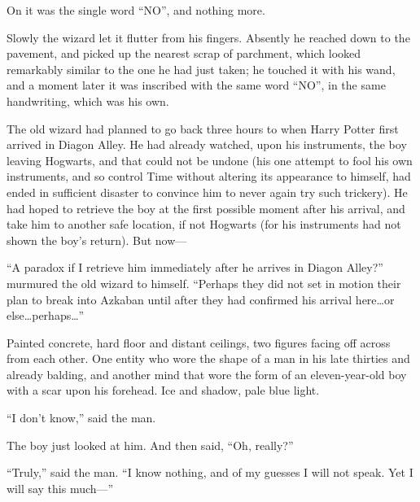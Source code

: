 On it was the single word
“NO”, and nothing more.

Slowly the wizard let it flutter from his fingers. Absently he reached down to the pavement, and picked up the nearest scrap of parchment, which looked remarkably similar to the one he had just taken; he touched it with his wand, and a moment later it was inscribed with the same word
“NO”, in the same handwriting, which was his own.

The old wizard had planned to go back three hours to when Harry Potter first arrived in Diagon Alley. He had already watched, upon his instruments, the boy leaving Hogwarts, and that could not be undone (his one attempt to fool his own instruments, and so control Time without altering its appearance to himself, had ended in sufficient disaster to convince him to never again try such trickery). He had hoped to retrieve the boy at the first possible moment after his arrival, and take him to another safe location, if not Hogwarts (for his instruments had not shown the boy’s return). But now—

“A paradox if I retrieve him immediately after he arrives in Diagon Alley?” murmured the old wizard to himself.
“Perhaps they did not set in motion their plan to break into Azkaban until after they had confirmed his arrival here…or else…perhaps…”

\later

Painted concrete, hard floor and distant ceilings, two figures facing off across from each other. One entity who wore the shape of a man in his late thirties and already balding, and another mind that wore the form of an eleven-year-old boy with a scar upon his forehead. Ice and shadow, pale blue light.

“I don’t know,” said the man.

The boy just looked at him. And then said,
“Oh, really?”

“Truly,” said the man.
“I know nothing, and of my guesses I will not speak. Yet I will say this much—”

